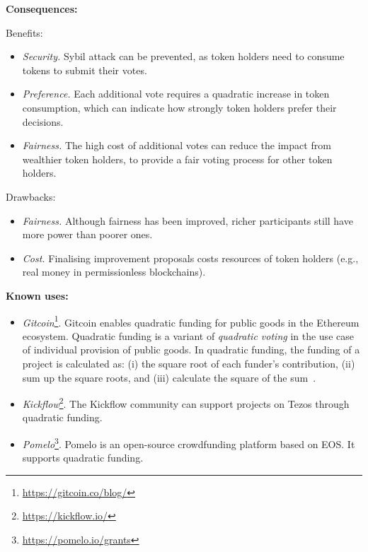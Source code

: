 \documentclass{article}
\begin{document}
\vspace{0.5em}\noindent \textbf{Consequences:} 

Benefits:
\begin{itemize}
  \item \textit{Security.} Sybil attack can be prevented, as token holders need to consume tokens to submit their votes.
  
  \item \textit{Preference.} Each additional vote requires a quadratic increase in token consumption, which can indicate how strongly token holders prefer their decisions.
  
  \item \textit{Fairness.} The high cost of additional votes can reduce the impact from wealthier token holders, to provide a fair voting process for other token holders.
\end{itemize}

Drawbacks:
\begin{itemize}

  
  \item \textit{Fairness.} Although fairness has been improved, richer participants still have more power than poorer ones.
  
  \item \textit{Cost.} Finalising improvement proposals costs resources of token holders (e.g., real money in permissionless blockchains).
\end{itemize}



\vspace{0.5em}\noindent \textbf{Known uses:}  
 \begin{itemize}
   \item \textit{Gitcoin}\footnote{\url{https://gitcoin.co/blog/}}. Gitcoin enables quadratic funding for public goods in the Ethereum ecosystem. Quadratic funding is a variant of \textit{quadratic voting} in the use case of individual provision of public goods. In quadratic funding, the funding of a project is calculated as: (i) the square root of each funder's contribution, (ii) sum up the square roots, and (iii) calculate the square of the sum~\cite{buterin2018liberal}.
   
   \item \textit{Kickflow}\footnote{\url{https://kickflow.io/}}. The Kickflow community can support projects on Tezos through quadratic funding.
   
   \item \textit{Pomelo}\footnote{\url{https://pomelo.io/grants}}. Pomelo is an open-source crowdfunding platform based on EOS. It supports quadratic funding.
 \end{itemize}
\end{document}
